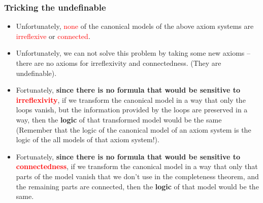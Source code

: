 \documentclass[xcolor=x11names]{beamer}
\newcommand{\pecset}[2]{\begin{tikzpicture}[remember picture,overlay]
\node [ draw=red,
        rectangle,
        rounded corners=5mm,
        inner sep=1mm,
        ultra thick,
        fill=white,
        fill opacity=.8,
        rotate=30,
        scale=#1,
        text opacity=0.7]
        at (current page.center)
        {#2};
\end{tikzpicture}}
\newcommand{\cemph}[1]{\textcolor{red}{#1}}
\renewcommand{\emph}[1]{\textbf{#1}}
\begin{document}
\begin{frame}[t]
\frametitle{Tricking the undefinable}
\footnotesize

\begin{itemize}
\item Unfortunately, \cemph{none} of the canonical models of the above axiom systems are \cemph{irreflexive} or \cemph{connected}.
\pause
\item Unfortunately, we can not solve this problem by taking some new axioms -- there are no axioms for irreflexivity and connectedness. (They are undefinable).
\pause
\item Fortunately, \emph{since there is no formula that would be sensitive to \cemph{irreflexivity}}, if we transform the canonical model in a way that only the loops vanish, but the information provided by the loops are preserved in a way, then the \emph{logic} of that transformed model would be the same (Remember that the logic of the canonical model of an axiom system is the logic of the all models of that axiom system!).
\pause
\item Fortunately, \emph{since there is no formula that would be sensitive to \cemph{connectedness}}, if we transform the canonical model in a way that only that parts of the model vanish that we don't use in the completeness theorem, and the remaining parts are connected, then the \emph{logic} of that model would be the same.
\end{itemize}


\end{frame}
\end{document}
